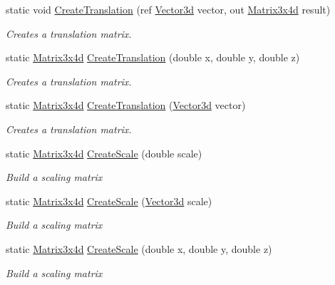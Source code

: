 \begin{DoxyCompactItemize}
static void \hyperlink{struct_open_t_k_1_1_matrix3x4d_ad5dec08226b7f8659db5c7fb0a1ee12e}{Create\-Translation} (ref \hyperlink{struct_open_t_k_1_1_vector3d}{Vector3d} vector, out \hyperlink{struct_open_t_k_1_1_matrix3x4d}{Matrix3x4d} result)
\begin{DoxyCompactList}\small\item\em Creates a translation matrix. \end{DoxyCompactList}\item 
static \hyperlink{struct_open_t_k_1_1_matrix3x4d}{Matrix3x4d} \hyperlink{struct_open_t_k_1_1_matrix3x4d_ac128f1bcc96920c2d30061b5f55e1be2}{Create\-Translation} (double x, double y, double z)
\begin{DoxyCompactList}\small\item\em Creates a translation matrix. \end{DoxyCompactList}\item 
static \hyperlink{struct_open_t_k_1_1_matrix3x4d}{Matrix3x4d} \hyperlink{struct_open_t_k_1_1_matrix3x4d_a70ee4381d0f4578718200d27ac940ed4}{Create\-Translation} (\hyperlink{struct_open_t_k_1_1_vector3d}{Vector3d} vector)
\begin{DoxyCompactList}\small\item\em Creates a translation matrix. \end{DoxyCompactList}\item 
static \hyperlink{struct_open_t_k_1_1_matrix3x4d}{Matrix3x4d} \hyperlink{struct_open_t_k_1_1_matrix3x4d_a9c0ef1ddd50164fb0b6f691969d2b850}{Create\-Scale} (double scale)
\begin{DoxyCompactList}\small\item\em Build a scaling matrix \end{DoxyCompactList}\item 
static \hyperlink{struct_open_t_k_1_1_matrix3x4d}{Matrix3x4d} \hyperlink{struct_open_t_k_1_1_matrix3x4d_af41b6e6f6e8a25f41bcd04c1ee5f2265}{Create\-Scale} (\hyperlink{struct_open_t_k_1_1_vector3d}{Vector3d} scale)
\begin{DoxyCompactList}\small\item\em Build a scaling matrix \end{DoxyCompactList}\item 
static \hyperlink{struct_open_t_k_1_1_matrix3x4d}{Matrix3x4d} \hyperlink{struct_open_t_k_1_1_matrix3x4d_a3c781a0494d035c4f6b9463590b3cb66}{Create\-Scale} (double x, double y, double z)
\begin{DoxyCompactList}\small\item\em Build a scaling matrix \end{DoxyCompactList}\item 

\end{DoxyCompactItemize}
